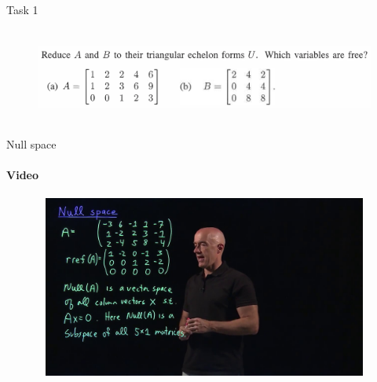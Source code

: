 \documentclass[aspectratio=169]{beamer}
\begin{document}
\begin{frame}[t]{Task 1}
    \framesubtitle{}
    \begin{figure}[H]
        \centering\includegraphics[height=3cm,width=1\textwidth,keepaspectratio]{1.png}
        \label{fig:1.png}
    \end{figure}
\end{frame}


\begin{frame}[t]{Null space}
    \framesubtitle{Video}
    \vspace{-0.6cm}
    \begin{figure}[H]
        \href{https://www.youtube.com/watch?v=C8zOd07U3l8}{
            \centering\includegraphics[height=6cm,width=1\textwidth,keepaspectratio]{null_space_preview.jpg}}
        \label{fig:null_space_preview.jpg}
    \end{figure}
\end{frame}
\end{document}
